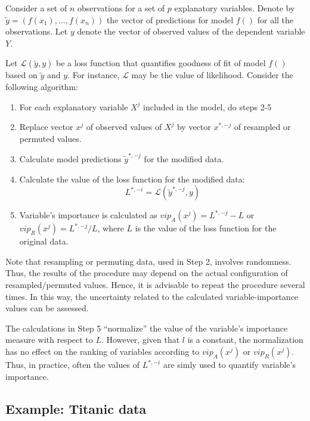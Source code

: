 \documentclass[12pt,]{krantz}
\providecommand{\tightlist}{%
  \setlength{\itemsep}{0pt}\setlength{\parskip}{0pt}}
\begin{document}
Consider a set of \(n\) observations for a set of \(p\) explanatory variables. Denote by \(\widetilde{y}=(f(x_1),\ldots,f(x_n))\) the vector of predictions for model \(f()\) for all the observations. Let \(y\) denote the vector of observed values of the dependent variable \(Y\).

Let \(\mathcal L(\widetilde{y}, y)\) be a loss function that quantifies goodness of fit of model \(f()\) based on \(\widetilde{y}\) and \(y\). For instance, \(\mathcal L\) may be the value of likelihood. Consider the following algorithm:

\begin{enumerate}
\def\labelenumi{\arabic{enumi}.}
\tightlist
\item
  For each explanatory variable \(X^j\) included in the model, do steps 2-5
\item
  Replace vector \(x^j\) of observed values of \(X^j\) by vector \(x^{*,-j}\) of resampled or permuted values.
\item
  Calculate model predictions \(\widetilde{y}^{*,-j}\) for the modified data.
\item
  Calculate the value of the loss function for the modified data:
  \[
  L^{*,-i} = \mathcal L(\widetilde{y}^{*,-j}, y)
  \]
\item
  Variable's importance is calculated as \(vip_A(x^j) = L^{*,-j} - L\) or \(vip_R(x^j) = L^{*,-j} / L\), where \(L\) is the value of the loss function for the original data.
\end{enumerate}

Note that resampling or permuting data, used in Step 2, involves randomness. Thus, the results of the procedure may depend on the actual configuration of resampled/permuted values. Hence, it is advisable to repeat the procedure several times. In this way, the uncertainty related to the calculated variable-importance values can be assessed.

The calculations in Step 5 ``normalize'' the value of the variable's importance measure with respect to \(L\). However, given that \(l\) is a constant, the normalization has no effect on the ranking of variables according to \(vip_A(x^j)\) or \(vip_R(x^j)\). Thus, in practice, often the values of \(L^{*,-i}\) are simly used to quantify variable's importance.

\hypertarget{featureImportanceTitanic}{%
\subsection{Example: Titanic data}\label{featureImportanceTitanic}}
\end{document}
